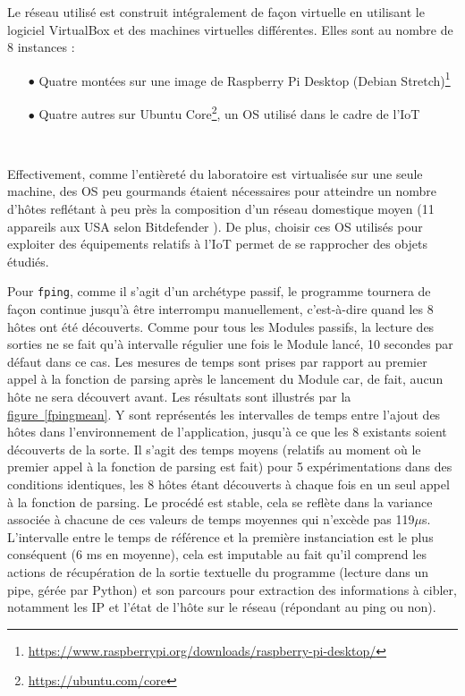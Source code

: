 \documentclass[]{article}
\newcommand{\minit}[1]{\noindent{\small\textbf{ \underline{#1}}}\vspace{0.2cm}}
\newcommand{\wordlink}[2]{\hyperref[#1]{#2~\ref{#1}}}
\begin{document}
Le réseau utilisé est construit intégralement de façon virtuelle en utilisant le logiciel VirtualBox et des machines virtuelles différentes. Elles sont au nombre de 8 instances :~\\
\begin{itemize}
\item[$\bullet$] Quatre montées sur une image de Raspberry Pi Desktop (Debian Stretch)\footnote{\url{https://www.raspberrypi.org/downloads/raspberry-pi-desktop/}}
\item[$\bullet$] Quatre autres sur Ubuntu Core\footnote{\url{https://ubuntu.com/core}}, un OS utilisé dans le cadre de l'IoT
\end{itemize}
~\\
\par Effectivement, comme l'entièreté du laboratoire est virtualisée sur une seule machine, des OS peu gourmands étaient nécessaires pour atteindre un nombre d'hôtes reflétant à peu près la composition d'un réseau domestique moyen (11 appareils aux USA selon Bitdefender \cite{bitdefender}). De plus, choisir ces OS utilisés pour exploiter des équipements relatifs à l'IoT permet de se rapprocher des objets étudiés.\\

\minit{Mesures pour \texttt{fping}}
\vspace{0.1cm}

\par Pour \texttt{fping}, comme il s'agit d'un archétype passif, le programme tournera de façon continue jusqu'à être interrompu manuellement, c'est-à-dire quand les 8 hôtes ont été découverts. Comme pour tous les Modules passifs, la lecture des sorties ne se fait qu'à intervalle régulier une fois le Module lancé, 10 secondes par défaut dans ce cas. Les mesures de temps sont prises par rapport au premier appel à la fonction de parsing après le lancement du Module car, de fait, aucun hôte ne sera découvert avant. Les résultats sont illustrés par la \wordlink{fpingmean}{figure}. Y sont représentés les intervalles de temps entre l'ajout des hôtes dans l'environnement de l'application, jusqu'à ce que les 8 existants soient découverts de la sorte. Il s'agit des temps moyens (relatifs au moment où le premier appel à la fonction de parsing est fait) pour 5 expérimentations dans des conditions identiques, les 8 hôtes étant découverts à chaque fois en un seul appel à la fonction de parsing. Le procédé est stable, cela se reflète dans la variance associée à chacune de ces valeurs de temps moyennes qui n'excède pas 119$\mu$s. L'intervalle entre le temps de référence et la première instanciation est le plus conséquent (6 ms en moyenne), cela est imputable au fait qu'il comprend les actions de récupération de la sortie textuelle du programme (lecture dans un pipe, gérée par Python) et son parcours pour extraction des informations à cibler, notamment les IP et l'état de l'hôte sur le réseau (répondant au ping ou non).
\end{document}
